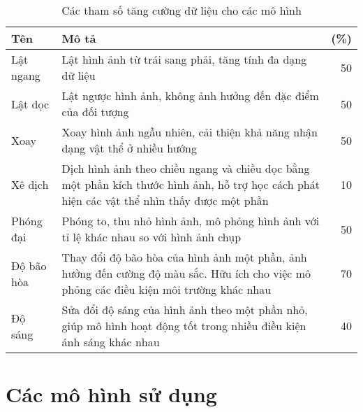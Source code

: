 \documentclass[../the.tex]{subfiles}
\begin{document}
\begin{table}[!h]
	\centering
	\caption{Các tham số tăng cường dữ liệu cho các mô hình}
	\begin{tabular}{|l|p{10cm}|r|}
		\hline
		\textbf{Tên}
		           & \textbf{Mô tả}
		           & \textbf{(\%)}
		\\ \hline
		Lật ngang  & Lật hình ảnh từ trái sang phải, tăng tính đa dạng dữ liệu                                                                                    & 50 \\  \hline
		Lật dọc    & Lật ngược hình ảnh, không ảnh hưởng đến đặc điểm của đối tượng                                                                               & 50 \\  \hline
		Xoay       & Xoay hình ảnh ngẫu nhiên, cải thiện khả năng nhận dạng vật thể ở nhiều hướng                                                                 & 50 \\  \hline
		Xê dịch    & Dịch hình ảnh theo chiều ngang và chiều dọc bằng một phần kích thước hình ảnh, hỗ trợ học cách phát hiện các vật thể nhìn thấy được một phần & 10 \\  \hline
		Phóng đại  & Phóng to, thu nhỏ hình ảnh, mô phỏng hình ảnh với tỉ lệ khác nhau so với hình ảnh chụp                                                       & 50 \\  \hline
		Độ bão hòa & Thay đổi độ bão hòa của hình ảnh một phần, ảnh hưởng đến cường độ màu sắc. Hữu ích cho việc mô phỏng các điều kiện môi trường khác nhau      & 70 \\ \hline
		Độ sáng    & Sửa đổi độ sáng của hình ảnh theo một phần nhỏ, giúp mô hình hoạt động tốt trong nhiều điều kiện ánh sáng khác nhau                          & 40 \\ \hline
	\end{tabular}
	\label{tab:thamso}
\end{table}

\bigskip


\section{Các mô hình sử dụng}
\label{sec:model}
\end{document}
